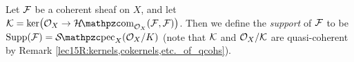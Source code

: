 %
%
%
%
%

 \begin{example}
   Let $\mathcal{F}$ be a coherent sheaf on $X$, and let $\K=\ker\bigl(\O_X\to
   \Hom_{\O_X}(\F,\F)\bigr)$. Then we define the \emph{support} of $\mathcal{F}$ to be
   $\supp(\F)=\Spec_X(\O_X/K)$ (note that $\mathcal{K}$ and $\mathcal{O}_X/\mathcal{K}$ are quasi-coherent by Remark
   \ref{lec15R:kernels,cokernels,etc._of_qcohs}).
 \end{example}

